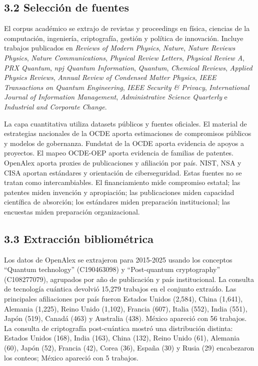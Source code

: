 \documentclass[
  11pt,
  letterpaper,
]{article}
\begin{document}
\subsection{3.2 Selección de fuentes}\label{selecciuxf3n-de-fuentes}

El corpus académico se extrajo de revistas y proceedings en física,
ciencias de la computación, ingeniería, criptografía, gestión y política
de innovación. Incluye trabajos publicados en \emph{Reviews of Modern
Physics}, \emph{Nature}, \emph{Nature Reviews Physics}, \emph{Nature
Communications}, \emph{Physical Review Letters}, \emph{Physical Review
A}, \emph{PRX Quantum}, \emph{npj Quantum Information}, \emph{Quantum},
\emph{Chemical Reviews}, \emph{Applied Physics Reviews}, \emph{Annual
Review of Condensed Matter Physics}, \emph{IEEE Transactions on Quantum
Engineering}, \emph{IEEE Security \& Privacy}, \emph{International
Journal of Information Management}, \emph{Administrative Science
Quarterly} e \emph{Industrial and Corporate Change}.

La capa cuantitativa utiliza datasets públicos y fuentes oficiales. El
material de estrategias nacionales de la OCDE aporta estimaciones de
compromisos públicos y modelos de gobernanza. Fundstat de la OCDE aporta
evidencia de apoyos a proyectos. El mapeo OCDE-OEP aporta evidencia de
familias de patentes. OpenAlex aporta proxies de publicaciones y
afiliación por país. NIST, NSA y CISA aportan estándares y orientación
de ciberseguridad. Estas fuentes no se tratan como intercambiables. El
financiamiento mide compromiso estatal; las patentes miden invención y
apropiación; las publicaciones miden capacidad científica de absorción;
los estándares miden preparación institucional; las encuestas miden
preparación organizacional.

\subsection{3.3 Extracción
bibliométrica}\label{extracciuxf3n-bibliomuxe9trica}

Los datos de OpenAlex se extrajeron para 2015-2025 usando los conceptos
``Quantum technology'' (C190463098) y ``Post-quantum cryptography''
(C108277079), agrupados por año de publicación y país institucional. La
consulta de tecnología cuántica devolvió 15,279 trabajos en el conjunto
extraído. Las principales afiliaciones por país fueron Estados Unidos
(2,584), China (1,641), Alemania (1,225), Reino Unido (1,102), Francia
(607), Italia (552), India (551), Japón (519), Canadá (463) y Australia
(438). México apareció con 56 trabajos. La consulta de criptografía
post-cuántica mostró una distribución distinta: Estados Unidos (168),
India (163), China (132), Reino Unido (61), Alemania (60), Japón (52),
Francia (42), Corea (36), España (30) y Rusia (29) encabezaron los
conteos; México apareció con 5 trabajos.
\end{document}
